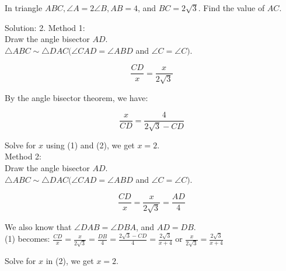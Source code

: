 \documentclass{article}
\begin{document}
In triangle \(A B C, \angle A=2 \angle B, A B=4\), and \(B C=2 \sqrt{3}\). Find the value of \(A C\).

Solution: 2.
Method 1:\\
Draw the angle bisector \(A D\).\\
\(\triangle A B C \sim \triangle D A C(\angle C A D=\angle A B D\) and \(\angle C=\angle C)\).

\[
\frac{C D}{x}=\frac{x}{2 \sqrt{3}}
\]

By the angle bisector theorem, we have:

\[
\frac{x}{C D}=\frac{4}{2 \sqrt{3}-C D}
\]

Solve for \(x\) using (1) and (2), we get \(x=2\).\\
Method 2:\\
Draw the angle bisector \(A D\).\\
\(\triangle A B C \sim \triangle D A C(\angle C A D=\angle A B D\) and \(\angle C=\angle C)\).

\[
\frac{C D}{x}=\frac{x}{2 \sqrt{3}}=\frac{A D}{4}
\]

We also know that \(\angle D A B=\angle D B A\), and \(A D=D B\).\\
(1) becomes: \(\frac{C D}{x}=\frac{x}{2 \sqrt{3}}=\frac{D B}{4}=\frac{2 \sqrt{3}-C D}{4}=\frac{2 \sqrt{3}}{x+4}\) or \(\frac{x}{2 \sqrt{3}}=\frac{2 \sqrt{3}}{x+4}\)

Solve for \(x\) in (2), we get \(x=2\).\\
\end{document}
